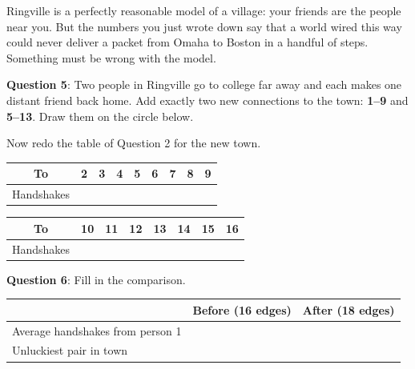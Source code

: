 \documentclass[a4paper, 14pt]{extarticle}
\begin{document}
Ringville is a perfectly reasonable model of a village: your friends are the
people near you. But the numbers you just wrote down say that a world wired
this way could never deliver a packet from Omaha to Boston in a handful of
steps. Something must be wrong with the model.

\vspace{2em}

{\bf Question 5}:
Two people in Ringville go to college far away and each makes one distant
friend back home. Add exactly two new connections to the town: \textbf{1--9}
and \textbf{5--13}. Draw them on the circle below.

\begin{center}
\end{center}

\begin{minipage}{\textwidth}
Now redo the table of Question 2 for the new town.

\begin{center}
\begin{tabular}{|c|p{0.7cm}|p{0.7cm}|p{0.7cm}|p{0.7cm}|p{0.7cm}|p{0.7cm}|p{0.7cm}|p{0.7cm}|}
\hline
To & 2 & 3 & 4 & 5 & 6 & 7 & 8 & 9 \\
\hline
Handshakes & & & & & & & & \\[0.5cm]
\hline
\end{tabular}

\vspace{0.3cm}

\begin{tabular}{|c|p{0.7cm}|p{0.7cm}|p{0.7cm}|p{0.7cm}|p{0.7cm}|p{0.7cm}|p{0.7cm}|}
\hline
To & 10 & 11 & 12 & 13 & 14 & 15 & 16 \\
\hline
Handshakes & & & & & & & \\[0.5cm]
\hline
\end{tabular}
\end{center}
\end{minipage}

\clearpage

{\bf Question 6}:
Fill in the comparison.

\begin{center}
\begin{tabular}{|l|p{3cm}|p{3cm}|}
\hline
 & Before (16 edges) & After (18 edges) \\
\hline
Average handshakes from person 1 & & \\[0.6cm]
\hline
Unluckiest pair in town & & \\[0.6cm]
\hline
\end{tabular}
\end{center}
\end{document}
